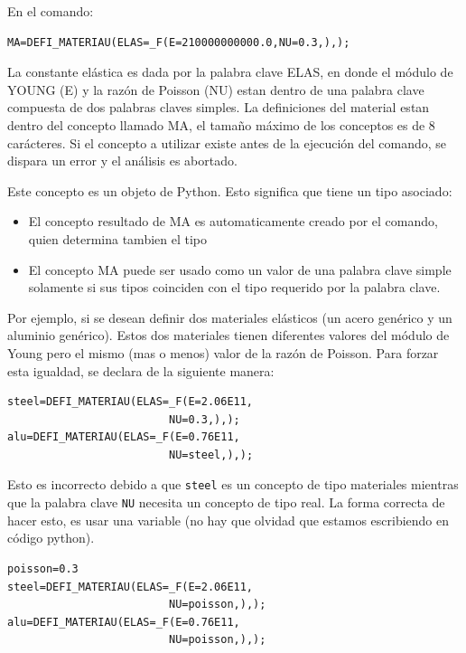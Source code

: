 \documentclass[12pt]{book}
\theoremstyle{definition}
\theoremstyle{remark}
\theoremstyle{plain}
\begin{document}
En el comando:

\begin{verbatim}
MA=DEFI_MATERIAU(ELAS=_F(E=210000000000.0,NU=0.3,),);
\end{verbatim}

La constante elástica es dada por la palabra clave ELAS, en donde el módulo de YOUNG
(E) y la razón de Poisson (NU) estan dentro de una palabra clave compuesta de
dos palabras claves simples. La definiciones del material estan dentro del concepto
llamado MA, el tamaño máximo de los conceptos es de 8 carácteres. Si el concepto
a utilizar existe antes de la ejecución del comando, se dispara un error y el análisis 
es abortado. 

Este concepto es un objeto de Python. Esto significa que tiene un tipo asociado:
\begin{itemize}
 \item El concepto resultado de MA es automaticamente creado por el comando, 
quien determina tambien el tipo
 \item El concepto MA puede ser usado como un valor de una palabra clave simple
solamente si sus tipos coinciden con el tipo requerido por la palabra clave.
\end{itemize}

Por ejemplo, si se desean definir dos materiales elásticos (un acero genérico y
un aluminio genérico). Estos dos materiales tienen diferentes valores del
módulo de Young pero el mismo (mas o menos) valor de la razón de Poisson. Para
forzar esta igualdad, se declara de la siguiente manera:
\begin{verbatim}
steel=DEFI_MATERIAU(ELAS=_F(E=2.06E11,
                         NU=0.3,),);
alu=DEFI_MATERIAU(ELAS=_F(E=0.76E11,
                         NU=steel,),);
\end{verbatim}

Esto es incorrecto debido a que \verb*|steel| es un concepto de tipo materiales
mientras que la palabra clave \verb*|NU| necesita un concepto de tipo real. La 
forma correcta de hacer esto, es usar una variable (no hay que olvidad que estamos
escribiendo en código python).

\begin{verbatim}
poisson=0.3
steel=DEFI_MATERIAU(ELAS=_F(E=2.06E11,
                         NU=poisson,),);
alu=DEFI_MATERIAU(ELAS=_F(E=0.76E11,
                         NU=poisson,),);
\end{verbatim}
\end{document}
